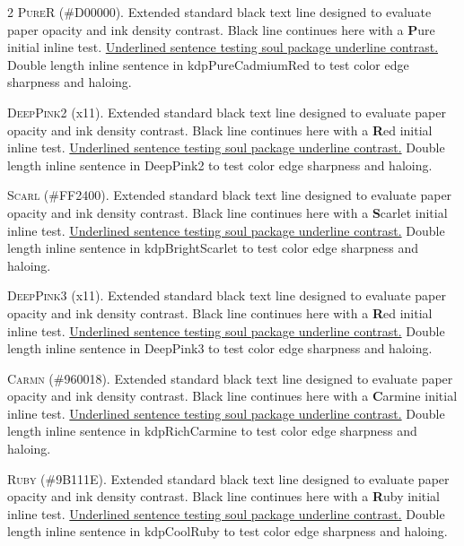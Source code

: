 \begin{multicols}{2}
\lettrine[lines=2]{\textcolor{kdpPureCadmiumRed}{P}}{ureR} (\#D00000). Extended standard black text line designed to evaluate paper opacity and ink density contrast. Black line continues here with a \textbf{\textcolor{kdpPureCadmiumRed}{P}}ure initial inline test. \ul{Underlined sentence testing soul package underline contrast.} \textcolor{kdpPureCadmiumRed}{Double length inline sentence in kdpPureCadmiumRed to test color edge sharpness and haloing.}


\lettrine[lines=2]{\textcolor{DeepPink2}{D}}{eepPink2} (x11). Extended standard black text line designed to evaluate paper opacity and ink density contrast. Black line continues here with a \textbf{\textcolor{DeepPink2}{R}}ed initial inline test. \ul{Underlined sentence testing soul package underline contrast.} \textcolor{DeepPink2}{Double length inline sentence in DeepPink2 to test color edge sharpness and haloing.}


\lettrine[lines=2]{\textcolor{kdpBrightScarlet}{S}}{carl} (\#FF2400). Extended standard black text line designed to evaluate paper opacity and ink density contrast. Black line continues here with a \textbf{\textcolor{kdpBrightScarlet}{S}}carlet initial inline test. \ul{Underlined sentence testing soul package underline contrast.} \textcolor{kdpBrightScarlet}{Double length inline sentence in kdpBrightScarlet to test color edge sharpness and haloing.}


\lettrine[lines=2]{\textcolor{DeepPink3}{D}}{eepPink3} (x11). Extended standard black text line designed to evaluate paper opacity and ink density contrast. Black line continues here with a \textbf{\textcolor{DeepPink3}{R}}ed initial inline test. \ul{Underlined sentence testing soul package underline contrast.} \textcolor{DeepPink3}{Double length inline sentence in DeepPink3 to test color edge sharpness and haloing.}


\lettrine[lines=2]{\textcolor{kdpRichCarmine}{C}}{armn} (\#960018). Extended standard black text line designed to evaluate paper opacity and ink density contrast. Black line continues here with a \textbf{\textcolor{kdpRichCarmine}{C}}armine initial inline test. \ul{Underlined sentence testing soul package underline contrast.} \textcolor{kdpRichCarmine}{Double length inline sentence in kdpRichCarmine to test color edge sharpness and haloing.}


\lettrine[lines=2]{\textcolor{kdpCoolRuby}{R}}{uby} (\#9B111E). Extended standard black text line designed to evaluate paper opacity and ink density contrast. Black line continues here with a \textbf{\textcolor{kdpCoolRuby}{R}}uby initial inline test. \ul{Underlined sentence testing soul package underline contrast.} \textcolor{kdpCoolRuby}{Double length inline sentence in kdpCoolRuby to test color edge sharpness and haloing.}



\end{multicols}
